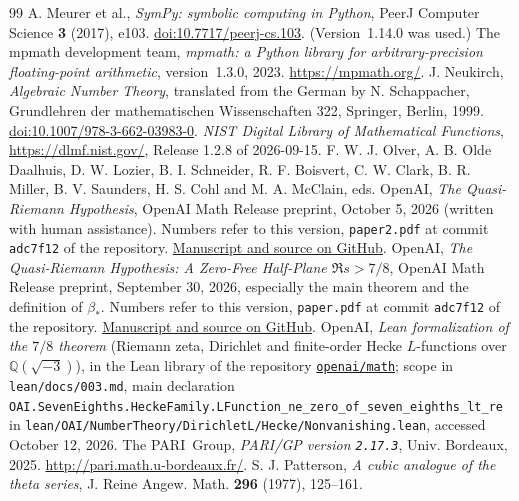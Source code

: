 \documentclass[11pt]{article}
\numberwithin{equation}{section}
\begin{document}
\begin{thebibliography}{99}
 A. Meurer et al., \emph{SymPy: symbolic computing in Python},
 PeerJ Computer Science \textbf{3} (2017), e103.
 \href{https://doi.org/10.7717/peerj-cs.103}{doi:10.7717/peerj-cs.103}. (Version~1.14.0 was used.)
 The mpmath development team, \emph{mpmath: a Python library for arbitrary-precision
 floating-point arithmetic}, version~1.3.0, 2023. \url{https://mpmath.org/}.
 J. Neukirch, \emph{Algebraic Number Theory}, translated from the German by
 N. Schappacher, Grundlehren der mathematischen Wissenschaften 322, Springer, Berlin, 1999.
 \href{https://doi.org/10.1007/978-3-662-03983-0}{doi:10.1007/978-3-662-03983-0}.
 \emph{NIST Digital Library of Mathematical Functions}, \url{https://dlmf.nist.gov/},
 Release 1.2.8 of 2026-09-15. F. W. J. Olver, A. B. Olde Daalhuis, D. W. Lozier, B. I. Schneider,
 R. F. Boisvert, C. W. Clark, B. R. Miller, B. V. Saunders, H. S. Cohl and M. A. McClain, eds.
 OpenAI, \emph{The Quasi-Riemann Hypothesis}, OpenAI Math Release preprint,
 October 5, 2026 (written with human assistance). Numbers refer to this version, \texttt{paper2.pdf} at commit \texttt{adc7f12} of the repository.
 \href{https://github.com/openai/math/tree/adc7f1241b42e322a6451854ab7e4b4c146bf78a/preprints/The-Quasi-Riemann-Hypothesis-October-5-2026}{Manuscript and source on GitHub}.
 OpenAI, \emph{The Quasi-Riemann Hypothesis: A Zero-Free
 Half-Plane $\Re s>7/8$}, OpenAI Math Release preprint, September 30, 2026,
 especially the main theorem and the definition of $\beta_*$.
 Numbers refer to this version, \texttt{paper.pdf} at commit \texttt{adc7f12} of the repository.
 \href{https://github.com/openai/math/tree/adc7f1241b42e322a6451854ab7e4b4c146bf78a/preprints/The-Quasi-Riemann-Hypothesis-September-30-2026}{Manuscript and source on GitHub}.
 OpenAI, \emph{Lean formalization of the $7/8$ theorem} (Riemann zeta, Dirichlet and
 finite-order Hecke $L$-functions over $\mathbb Q(\sqrt{-3})$), in the Lean library of the repository
 \href{https://github.com/openai/math}{\texttt{openai/math}}; scope in \texttt{lean/docs/003.md}, main
 declaration \texttt{OAI.SevenEighths.HeckeFamily.LFunction\_ne\_zero\_of\_seven\_eighths\_lt\_re} in
 \texttt{lean/OAI/NumberTheory/DirichletL/Hecke/Nonvanishing.lean}, accessed October 12, 2026.
 The PARI~Group, \emph{PARI/GP version \texttt{2.17.3}}, Univ. Bordeaux, 2025.
 \url{http://pari.math.u-bordeaux.fr/}.
 S. J. Patterson, \emph{A cubic analogue of the theta series},
 J. Reine Angew. Math. \textbf{296} (1977), 125--161.

\end{thebibliography}
\end{document}

